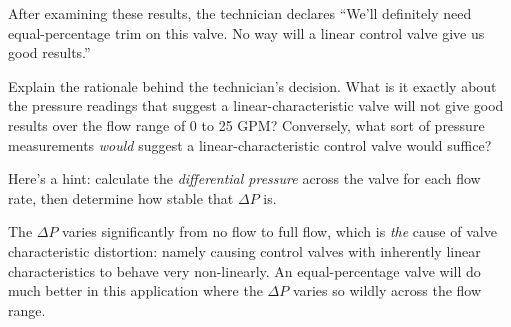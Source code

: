 After examining these results, the technician declares ``We'll definitely need equal-percentage trim on this valve.  No way will a linear control valve give us good results.''

\vskip 10pt

Explain the rationale behind the technician's decision.  What is it exactly about the pressure readings that suggest a linear-characteristic valve will not give good results over the flow range of 0 to 25 GPM?  Conversely, what sort of pressure measurements {\it would} suggest a linear-characteristic control valve would suffice?







Here's a hint: calculate the {\it differential pressure} across the valve for each flow rate, then determine how stable that $\Delta P$ is.







The $\Delta P$ varies significantly from no flow to full flow, which is {\it the} cause of valve characteristic distortion: namely causing control valves with inherently linear characteristics to behave very non-linearly.  An equal-percentage valve will do much better in this application where the $\Delta P$ varies so wildly across the flow range.




